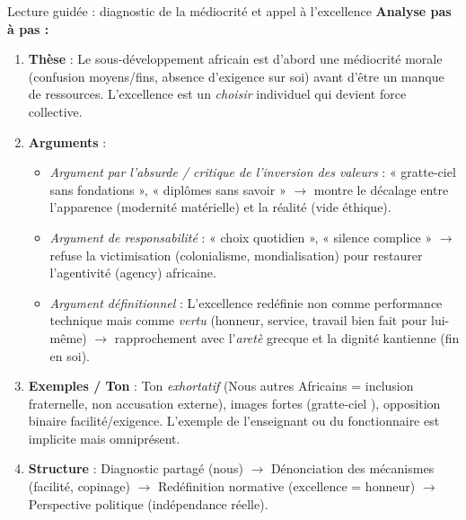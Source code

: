 \documentclass[11pt]{article}
\newcommand{\cle}[1]{{\popxbold\color{popdark}#1}}
\begin{document}
\begin{experience}{Lecture guidée : diagnostic de la médiocrité et appel à l'excellence}
\textbf{Analyse pas à pas :}
\begin{enumerate}
    \item \textbf{Thèse} : Le sous-développement africain est d'abord une \cle{médiocrité morale} (confusion moyens/fins, absence d'exigence sur soi) avant d'être un manque de ressources. L'excellence est un \emph{choisir} individuel qui devient force collective.
    \item \textbf{Arguments} : 
    \begin{itemize}
        \item \emph{Argument par l'absurde / critique de l'inversion des valeurs} : « gratte-ciel sans fondations », « diplômes sans savoir » $\rightarrow$ montre le décalage entre l'apparence (modernité matérielle) et la réalité (vide éthique).
        \item \emph{Argument de responsabilité} : « choix quotidien », « silence complice » $\rightarrow$ refuse la victimisation (colonialisme, mondialisation) pour restaurer l'agentivité (\cle{agency}) africaine.
        \item \emph{Argument définitionnel} : L'excellence redéfinie non comme performance technique mais comme \emph{vertu} (honneur, service, travail bien fait pour lui-même) $\rightarrow$ rapprochement avec l'\emph{aretè} grecque et la \cle{dignité} kantienne (fin en soi).
    \end{itemize}
    \item \textbf{Exemples / Ton} : Ton \emph{exhortatif} (\guillemotleft Nous autres Africains \guillemotright = inclusion fraternelle, non accusation externe), images fortes (\guillemotleft gratte-ciel \guillemotright), opposition binaire facilité/exigence. L'exemple de l'enseignant ou du fonctionnaire est implicite mais omniprésent.
    \item \textbf{Structure} : Diagnostic partagé (nous) $\rightarrow$ Dénonciation des mécanismes (facilité, copinage) $\rightarrow$ Redéfinition normative (excellence = honneur) $\rightarrow$ Perspective politique (indépendance réelle).
\end{enumerate}
\end{experience}
\end{document}
